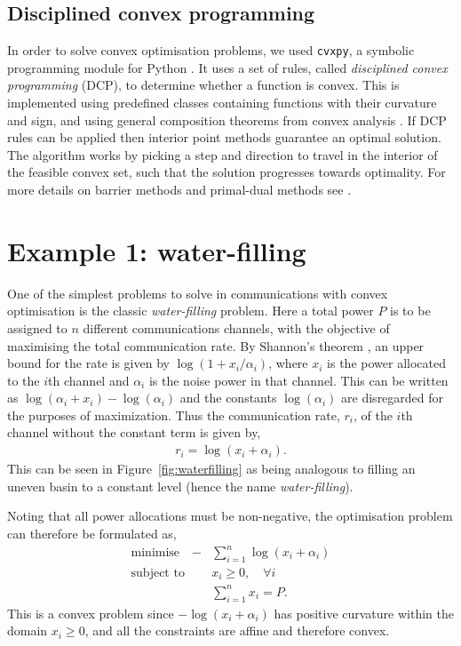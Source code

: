 \documentclass[twocolumn,secnumarabic,amssymb, nobibnotes, aps, prl,superscriptaddress]{revtex4-1}
\begin{document}
\subsection{Disciplined convex programming}
\noindent In order to solve convex optimisation problems, we used \texttt{cvxpy}, a symbolic programming module for Python \cite{cvxpy}. It uses a set of rules, called \textit{disciplined convex programming} (DCP), to determine whether a function is convex. This is implemented using predefined classes containing functions with their curvature and sign, and using general composition theorems from convex analysis \cite{dcp}. If DCP rules can be applied then interior point methods guarantee an optimal solution. 
 The algorithm works by picking a step and direction to travel in the interior of the feasible convex set, such that the solution progresses towards optimality. For more details on barrier methods and primal-dual methods see \citep[p.561]{cvxpybook}.
 
\section{Example 1: water-filling}
 
\noindent{}One of the simplest problems to solve in communications with convex optimisation is the classic \textit{water-filling} problem.  Here a total power $P$ is to be assigned to $n$ different communications channels, with the objective of maximising the total communication rate.  By Shannon's theorem \citep[p.245]{cvxpybook}, an upper bound for the rate is given by $\log(1+x_i/\alpha_i)$, where $x_i$ is the power allocated to the $i$th channel and $\alpha_i$ is the noise power in that channel. This can be written as $\log(\alpha_i+x_i)-\log(\alpha_i)$ and the constants $\log(\alpha_i)$ are disregarded for the purposes of maximization. Thus the communication rate, $r_i$, of the $i$th channel without the constant term is given by,
 \begin{align}
  r_i = \log(x_i+\alpha_i).
 \end{align}
This can be seen in Figure~\ref{fig:waterfilling} as being analogous to filling an uneven basin to a constant level (hence the name \textit{water-filling}).
 
Noting that all power allocations must be non-negative, the optimisation problem can therefore be formulated as,
 \begin{align}
\text{minimise} \quad  -&\sum_{i=1}^{n} \log(x_i+\alpha_i) \nonumber \\
\text{subject to} \quad &x_i \geqslant 0, \quad \forall i \nonumber \\
&\sum_{i=1}^{n}x_i = P.
 \end{align}
This is a convex problem since $-\log(x_i+\alpha_i)$ has positive curvature within the domain $x_i \geqslant 0$, and all the constraints are affine and therefore convex.
\end{document}
